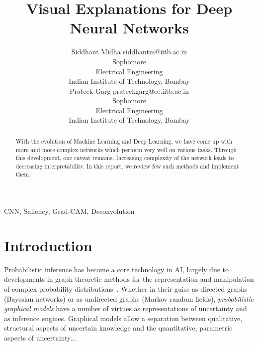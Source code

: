 \documentclass[twoside,11pt]{article}
\begin{document}
\title{Visual Explanations for Deep Neural Networks}

\author{\name Siddhant Midha \email siddhantm@iitb.ac.in \\
       \addr Sophomore \\
       Electrical Engineering\\
       Indian Institute of Technology, Bombay \\
       \name Prateek Garg \email prateekgarg@ee.iitb.ac.in \\
       \addr Sophomore \\
       Electrical Engineering\\
       Indian Institute of Technology, Bombay}


\maketitle

\begin{abstract}%
With the evolution of Machine Learning and Deep Learning, we have come up with more and more complex networks which perform very well on various tasks. Through this development, one caveat remains. Increasing complexity of the network leads to decreasing interpretability. In this report, we review few such methods and implement them. 
\end{abstract}

\begin{keywords}
CNN, Saliency, Grad-CAM, Deconvolution
\end{keywords}

\section{Introduction}

Probabilistic inference has become a core technology in AI,
largely due to developments in graph-theoretic methods for the 
representation and manipulation of complex probability 
distributions~\citep{pearl:88}.  Whether in their guise as 
directed graphs (Bayesian networks) or as undirected graphs (Markov 
random fields), \emph{probabilistic graphical models} have a number 
of virtues as representations of uncertainty and as inference engines.  
Graphical models allow a separation between qualitative, structural
aspects of uncertain knowledge and the quantitative, parametric aspects 
of uncertainty...\\
\end{document}
